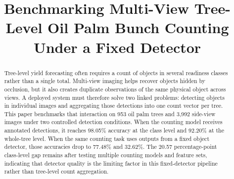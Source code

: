 \documentclass[conference]{IEEEtran}
\begin{document}
\title{Benchmarking Multi-View Tree-Level Oil Palm Bunch Counting Under a Fixed Detector}

\author{%
}

\maketitle

\begin{abstract}
Tree-level yield forecasting often requires a count of objects in several
readiness classes rather than a single total. Multi-view imaging helps recover
objects hidden by occlusion, but it also creates duplicate observations of the
same physical object across views. A deployed system must therefore solve two
linked problems: detecting objects in individual images and aggregating those
detections into one count vector per tree. This paper benchmarks that interaction
on 953 oil palm trees and 3,992 side-view images under two controlled detection
conditions. When the counting model receives annotated detections, it reaches
98.05\% accuracy at the class level and 92.20\% at the whole-tree level. When the
same counting task uses outputs from a fixed object detector, those accuracies
drop to 77.48\% and 32.62\%. The 20.57 percentage-point class-level gap remains
after testing multiple counting models and feature sets, indicating that detector
quality is the limiting factor in this fixed-detector pipeline rather than
tree-level count aggregation.
\end{abstract}
\end{document}
